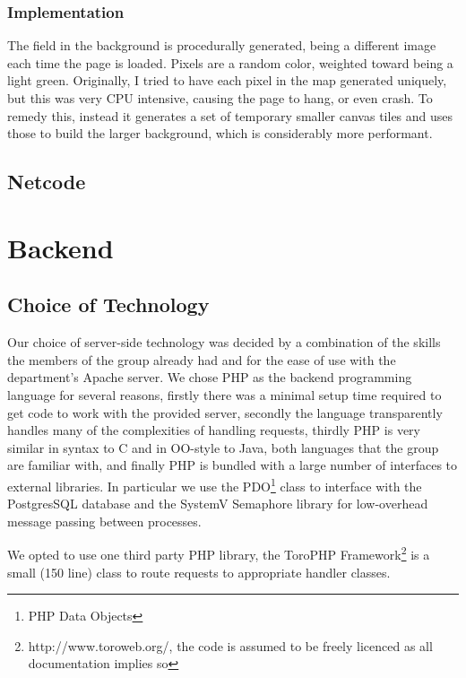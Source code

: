 \documentclass[12pt]{amsart}
\begin{document}
    \subsubsection{Implementation}
      \begin{flushleft}
        The field in the background is procedurally generated, being a different image each time the page is loaded. Pixels are a random color, weighted toward being a light green. Originally, I tried to have each pixel in the map generated uniquely, but this was very CPU intensive, causing the page to hang, or even crash. To remedy this, instead it generates a set of temporary smaller canvas tiles and uses those to build the larger background, which is considerably more performant.
      \end{flushleft}
  \subsection{Netcode}
    \begin{flushleft}
    \end{flushleft}
\section{Backend}
  \subsection{Choice of Technology}
    \begin{flushleft}
      Our choice of server-side technology was decided by a combination of the skills the members of the group already had and for the ease of use with the department's Apache server. We chose PHP as the backend programming language for several reasons, firstly there was a minimal setup time required to get code to work with the provided server, secondly the language transparently handles many of the complexities of handling requests, thirdly PHP is very similar in syntax to C and in OO-style to Java, both languages that the group are familiar with, and finally PHP is bundled with a large number of interfaces to external libraries.
In particular we use the PDO\footnote{PHP Data Objects} class to interface with the PostgresSQL database and the SystemV Semaphore library for low-overhead message passing between processes.

We opted to use one third party PHP library, the ToroPHP Framework\footnote{http://www.toroweb.org/, the code is assumed to be freely licenced as all documentation implies so} is a small (150 line) class to route requests to appropriate handler classes.
    \end{flushleft}
\end{document}
